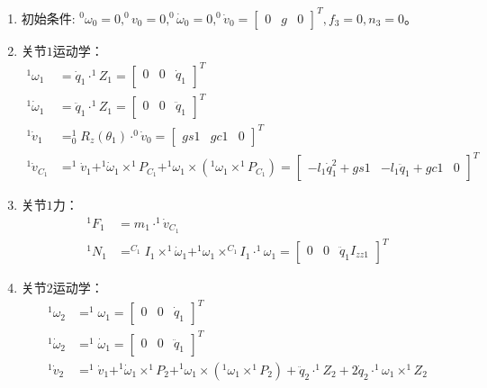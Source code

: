 \documentclass[
12pt, %
a4paper, 
oneside, %
headinclude,footinclude, %
]{scrartcl}
\begin{document}
{\begin{enumerate}
\item 初始条件: $ ^0\omega_0 = 0, ^0v_0 = 0, ^0\dot{\omega}_0 = 0, ^0\dot{v}_0 = \begin{bmatrix} 0 & g & 0 \end{bmatrix}^T, f_3 = 0, n_3 = 0 $。
\item 关节$ 1 $运动学：
\begin{align*}
^1\omega_1 &= \dot{q}_1 \cdot ^1Z_1 = \begin{bmatrix} 0 & 0 & \dot{q}_1 \end{bmatrix}^T \\
^1\dot{\omega}_1 &= \ddot{q}_1 \cdot ^1Z_1 = \begin{bmatrix} 0 & 0 & \ddot{q}_1 \end{bmatrix}^T \\
^1\dot{v}_1 &= ^1_0R_z(\theta_1) \cdot ^0\dot{v}_0 = \begin{bmatrix} gs1 & gc1 & 0 \end{bmatrix}^T \\
^1\dot{v}_{C_1} &= ^1\dot{v}_1 + ^1\dot{\omega}_1 \times ^1P_{C_1} + ^1\omega_1 \times (^1\omega_1 \times ^1P_{C_1}) = \begin{bmatrix} -l_1\dot{q}_1^2 + gs1 & -l_1\ddot{q}_1 + gc1 & 0 \end{bmatrix}^T
\end{align*}
\item 关节$ 1 $力：
\begin{align*}
^1F_1 &= m_1 \cdot ^1\dot{v}_{C_1} \\
^1N_1 &= ^{C_1}I_1 \times ^1\dot{\omega}_1 + ^1\omega_1 \times ^{C_1}I_1 \cdot ^1\omega_1 = \begin{bmatrix} 0 & 0 & \ddot{q}_1 I_{zz1} \end{bmatrix}^T
\end{align*}
\item 关节$ 2 $运动学：
\begin{align*}
^1\omega_2 &= ^1\omega_1 = \begin{bmatrix} 0 & 0 & \dot{q}_1 \end{bmatrix}^T \\
^1\dot{\omega}_2 &= ^1\dot{\omega}_1 = \begin{bmatrix} 0 & 0 & \ddot{q}_1 \end{bmatrix}^T \\
^1\dot{v}_2 &= ^1\dot{v}_1 + ^1\dot{\omega}_1 \times ^1P_2 + ^1\omega_1 \times (^1\omega_1 \times ^1P_2) + \ddot{q}_2 \cdot ^1Z_2 + 2\dot{q}_2 \cdot ^1\omega_1 \times ^1Z_2 \\

\end{align*}
\end{enumerate}}
\end{document}
